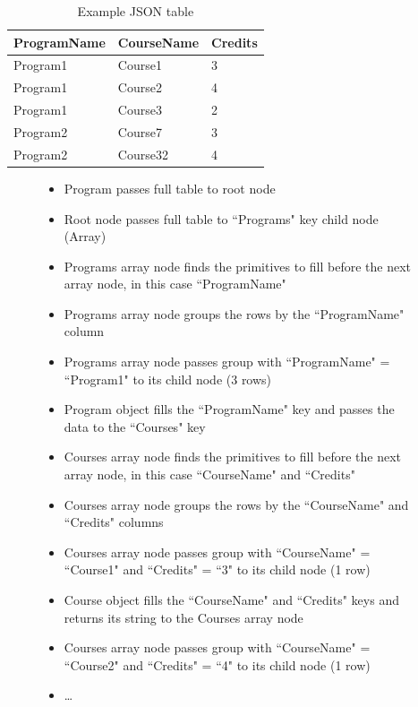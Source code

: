 \begin{table}[]
    \begin{tabular}{|lll|}
    \hline
    ProgramName & CourseName & Credits \\ \hline
    Program1    & Course1    & 3       \\
    Program1    & Course2    & 4       \\
    Program1    & Course3    & 2       \\
    Program2    & Course7    & 3       \\
    Program2    & Course32   & 4       \\ \hline
    \end{tabular}
    \caption{Example JSON table}
    \label{table:json_table}
\end{table}

\begin{figure}[]
    \begin{itemize}
        \item Program passes full table to root node
        \item Root node passes full table to ``Programs" key child node (Array)
        \item Programs array node finds the primitives to fill before the next array node, in this case ``ProgramName"
        \item Programs array node groups the rows by the ``ProgramName" column
        \item Programs array node passes group with ``ProgramName" = ``Program1" to its child node (3 rows)
        \item Program object fills the ``ProgramName" key and passes the data to the ``Courses" key
        \item Courses array node finds the primitives to fill before the next array node, in this case ``CourseName" and ``Credits"
        \item Courses array node groups the rows by the ``CourseName" and ``Credits" columns
        \item Courses array node passes group with ``CourseName" = ``Course1" and ``Credits" = ``3" to its child node (1 row)
        \item Course object fills the ``CourseName" and ``Credits" keys and returns its string to the Courses array node
        \item Courses array node passes group with ``CourseName" = ``Course2" and ``Credits" = ``4" to its child node (1 row)
        \item \dots

\end{itemize}
\end{figure}
